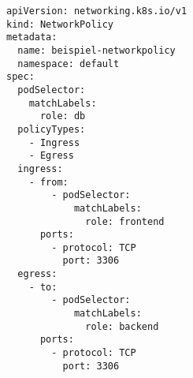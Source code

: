 \begin{verbatim}
apiVersion: networking.k8s.io/v1
kind: NetworkPolicy
metadata:
  name: beispiel-networkpolicy
  namespace: default
spec:
  podSelector:
    matchLabels:
      role: db
  policyTypes:
    - Ingress
    - Egress
  ingress:
    - from:
        - podSelector:
            matchLabels:
              role: frontend
      ports:
        - protocol: TCP
          port: 3306
  egress:
    - to:
        - podSelector:
            matchLabels:
              role: backend
      ports:
        - protocol: TCP
          port: 3306

\end{verbatim}